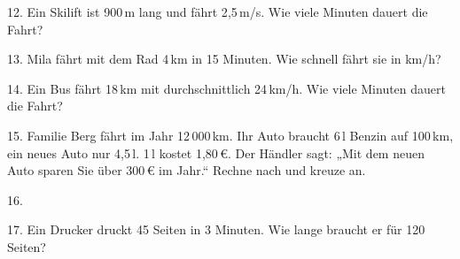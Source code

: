\documentclass[11pt]{article}
\begin{document}
\begin{pfaufg}{}{12.}{}
Ein Skilift ist 900\,m lang und fährt 2{,}5\,m/s. Wie viele Minuten dauert die Fahrt?
\end{pfaufg}

\begin{pfaufg}{}{13.}{}
Mila fährt mit dem Rad 4\,km in 15 Minuten. Wie schnell fährt sie in km/h?
\end{pfaufg}

\begin{pfaufg}{}{14.}{}
Ein Bus fährt 18\,km mit durchschnittlich 24\,km/h. Wie viele Minuten dauert die Fahrt?
\end{pfaufg}

\begin{pfaufg}{}{15.}{}
Familie Berg fährt im Jahr 12\,000\,km. Ihr Auto braucht 6\,l Benzin auf 100\,km, ein neues Auto nur 4{,}5\,l. 1\,l kostet 1{,}80\,€. Der Händler sagt: „Mit dem neuen Auto sparen Sie über 300\,€ im Jahr.“ Rechne nach und kreuze an.\par\smallskip {}
\end{pfaufg}

\begin{pfaufg}{}{16.}{}
\end{pfaufg}

\begin{pfaufg}{}{17.}{}
Ein Drucker druckt 45 Seiten in 3 Minuten. Wie lange braucht er für 120 Seiten?
\end{pfaufg}
\end{document}
